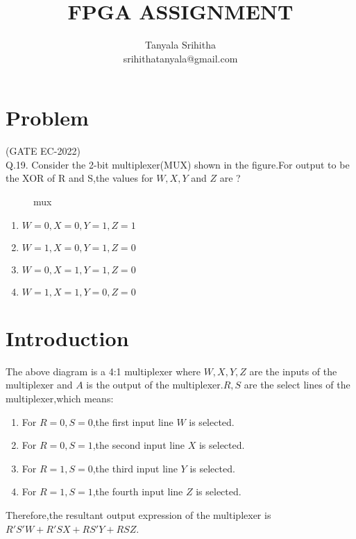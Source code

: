 \documentclass[journal,twocolumn,10pt, a4paper]{article}
\begin{document}
\lstset{ 
  language=C++,
  basicstyle=\ttfamily\footnotesize,
  breaklines=true,
  frame=lines}


\title{FPGA ASSIGNMENT}
\author{Tanyala Srihitha\\srihithatanyala@gmail.com}
\maketitle
\tableofcontents

\section{Problem}
(GATE EC-2022)\\

Q.19. Consider the 2-bit multiplexer(MUX) shown in the figure.For output to be the XOR of R and S,the values for $ W,X,Y$ and $Z$ are ?\newline
\begin{figure}[h]

\caption{mux}
\label{fig:1}
\end{figure}
\begin{enumerate}
\item $W = 0, X = 0, Y = 1, Z = 1$
\item $W = 1, X = 0, Y = 1, Z = 0$
\item $W = 0, X = 1, Y = 1, Z = 0$
\item $W = 1, X = 1, Y = 0, Z = 0$
\end{enumerate}

\section{Introduction}
	The above diagram is a 4:1 multiplexer where $W, X, Y, Z$ are the inputs of the multiplexer and $A$ is the output of the multiplexer.$R , S$ are the select lines of the multiplexer,which means:\newline
\begin{enumerate}
\item For $R = 0,S = 0$,the first input line $W$ is selected.
\item For $R = 0,S = 1$,the second input line $X$ is selected.
\item For $R = 1,S = 0$,the third input line $Y$ is selected.
\item For $R = 1,S = 1$,the fourth input line $Z$ is selected.
\end{enumerate}
Therefore,the resultant output expression of the multiplexer is $R'S'W + R'SX + RS'Y + RSZ$.
\end{document}
